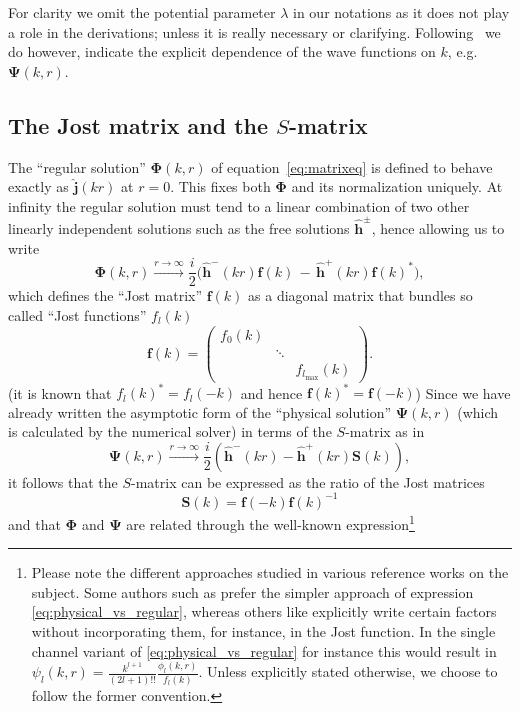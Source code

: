 \documentclass[mathpazo]{cicp}
\begin{document}
For clarity we omit the potential parameter $\lambda$ in our notations as it does not play a role in the derivations; unless it is really necessary or clarifying. Following~\cite{Taylor2006} we do however, indicate the explicit dependence of the wave functions on $k$, e.g.\ $\mathbold{\Psi}(k,r)$.

\subsection{The Jost matrix and the $S$-matrix}
\label{appsec:jost}
The ``regular solution'' $\mathbold{\Phi}(k,r)$ of equation~\eqref{eq:matrixeq} is defined to behave exactly as $\hat{\mathbold{j}}(kr)$ at $r=0$. This fixes both $\mathbold{\Phi}$ and its normalization uniquely. At infinity the regular solution must tend to a linear combination of two other linearly independent solutions such as the free solutions $\hat{\mathbold{h}}^{\pm}$, hence allowing us to write
\begin{equation}
	\mathbold{\Phi}(k,r) \xrightarrow{r\to\infty} \frac{i}{2}\Big( \hat{\mathbold{h}}^{-}(kr)\mathbold{f}(k) \, - \, \hat{\mathbold{h}}^{+}(kr){\mathbold{f}(k)}^{*} \Big),
\end{equation}
which defines the ``Jost matrix'' $\mathbold{f}(k)$ as a diagonal matrix that bundles so called ``Jost functions'' $f_{l}(k)$
\begin{equation}
	\mathbold{f}(k) = \begin{pmatrix}
		f_{0}(k) \\
		& \ddots \\
		&& f_{l_{\text{max}}}(k)
	\end{pmatrix}.
\end{equation}
(it is known that ${f_{l}(k)}^{*} = f_{l}(-k)$ and hence ${\mathbold{f}(k)}^{*} = \mathbold{f}(-k)$) Since we have already written the asymptotic form of the ``physical solution'' $\mathbold{\Psi}(k,r)$ (which is calculated by the numerical solver) in terms of the $S$-matrix as in
\begin{equation}
	\mathbold{\Psi}(k,r) \xrightarrow{r\to\infty} \frac{i}{2}\left( \hat{\mathbold{h}}^{-}(kr) - \hat{\mathbold{h}}^{+}(kr)\mathbold{S}(k) \right),
\end{equation}
it follows that the $S$-matrix can be expressed as the ratio of the Jost matrices
\begin{equation}
	\mathbold{S}(k) = \mathbold{f}(-k){\mathbold{f}(k)}^{-1}
\end{equation}
and that $\mathbold{\Phi}$ and $\mathbold{\Psi}$ are related through the well-known expression\footnote{Please note the different approaches studied in various reference works on the subject. Some authors such as \cite{Taylor2006} prefer the simpler approach of expression \eqref{eq:physical_vs_regular}, whereas others like \cite{Newton1982} explicitly write certain factors without incorporating them, for instance, in the Jost function. In the single channel variant of \eqref{eq:physical_vs_regular} for instance this would result in $\psi_{l}(k,r) = \frac{k^{l+1}}{(2l+1)!!}\frac{\phi_{l}(k,r)}{f_{l}(k)}$. Unless explicitly stated otherwise, we choose to follow the former convention.}
\end{document}
